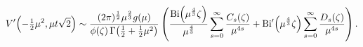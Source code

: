\[\mathop{V\/}\nolimits'\!\left(-\tfrac{1}{2}\mu^{2},\mu t\sqrt{2}\right)\sim%
\frac{(2\pi)^{\frac{1}{2}}\mu^{\frac{2}{3}}g(\mu)}{\phi(\zeta)\mathop{\Gamma\/%
}\nolimits\!\left(\tfrac{1}{2}+\tfrac{1}{2}\mu^{2}\right)}\*\left(\frac{%
\mathop{\mathrm{Bi}\/}\nolimits\!\left(\mu^{\frac{4}{3}}\zeta\right)}{\mu^{%
\frac{4}{3}}}\sum_{s=0}^{\infty}\frac{C_{s}(\zeta)}{\mu^{4s}}+\mathop{\mathrm{%
Bi}\/}\nolimits'\!\left(\mu^{\frac{4}{3}}\zeta\right)\sum_{s=0}^{\infty}\frac{%
D_{s}(\zeta)}{\mu^{4s}}\right).\]